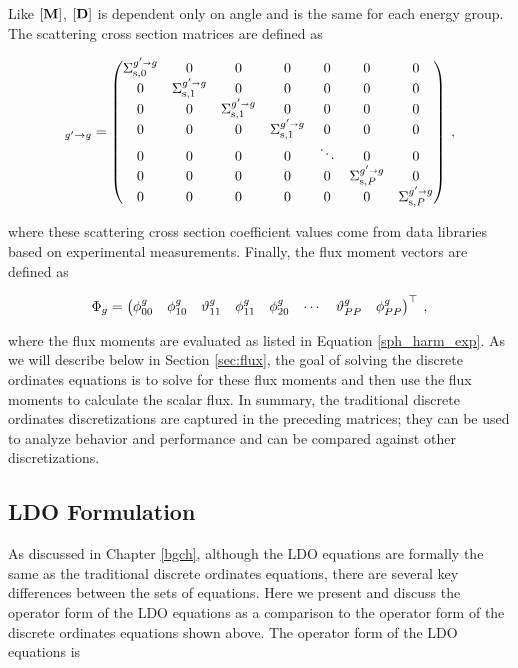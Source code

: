 \noindent Like $[\mathbf{M}]$, $[\mathbf{D}]$ is dependent only on angle and is the same for
each energy group. The scattering cross section matrices are defined as

\begin{equation}
  [\ve{S}]_{g'\rightarrow g} = \begin{pmatrix}
    \Sigg{0} & 0 & 0 & 0 & 0 & 0 & 0 \\
    0 & \Sigg{1} & 0 & 0 & 0 & 0 & 0 \\
    0 & 0 & \Sigg{1} & 0 & 0 & 0 & 0 \\
    0 & 0 & 0 & \Sigg{1} & 0 & 0 & 0 \\
    0 & 0 & 0 & 0 & \ddots   & 0 & 0 \\
    0 & 0 & 0 & 0 & 0 & \Sigg{P} & 0 \\
    0 & 0 & 0 & 0 & 0 & 0 & \Sigg{P}
  \end{pmatrix}\:,
\label{denovo_scatter}
\end{equation}

\noindent where these scattering cross section coefficient values come from data libraries based
on experimental measurements. Finally, the flux moment vectors are defined as

\begin{align}
  \Phi_g = \begin{pmatrix}
    \phi^g_{00} & \phi^g_{10} & \vartheta^g_{11} & \phi^g_{11} & \phi^g_{20}
    & \cdots & \vartheta^g_{PP} & \phi^g_{PP}
  \end{pmatrix}^\top\:,
\end{align}

\noindent where the flux moments are evaluated as listed in 
Equation \ref{sph_harm_exp}. As we will describe below in Section \ref{sec:flux}, the 
goal of solving the discrete ordinates equations is to solve for these flux moments 
and then use
the flux moments to calculate the scalar flux. In summary, the traditional discrete 
ordinates discretizations are captured in the preceding matrices; they can be used to
analyze behavior and performance and can be compared against other discretizations.

\subsection{LDO Formulation}

As discussed in Chapter \ref{bgch}, although the LDO equations are formally the same
as the traditional discrete ordinates equations, there are several key differences
between the sets of equations. Here we present and discuss the operator form of
the LDO equations as a comparison to the operator form of the discrete ordinates 
equations shown above. The operator form of the LDO equations is

